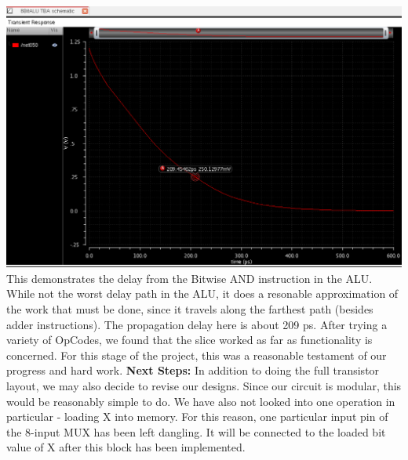 \documentclass[12pt]{article}
\begin{document}
  	\includegraphics[scale=0.4]{AndDelay.png} \\
	\newline \newline
  	This demonstrates the delay from the Bitwise AND instruction in the ALU. While not the worst 
	delay path in the ALU, it does a resonable approximation of the work that must be done, since 
	it travels along the farthest path (besides adder instructions). The propagation delay
	here is about 209 ps.
	\newline \newline
	After trying a variety of OpCodes, we found that the slice worked as far as functionality 
	is concerned. For this stage of the project, this was a reasonable testament of our progress
	and hard work.
	\newline \newline
	\textbf{Next Steps:}
	\newline \newline
	In addition to doing the full transistor layout, we may also decide to revise our designs. Since
	our circuit is modular, this would be reasonably simple to do. We have also not looked into
	one operation in particular - loading X into memory. For this reason, one particular input pin 
	of the 8-input MUX has been left dangling. It will be connected to the loaded bit value of
	X after this block has been implemented. 
  \section{}
	
\end{document}

